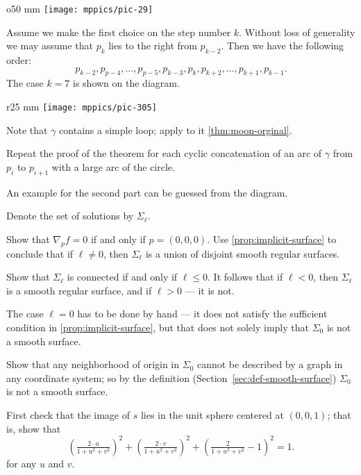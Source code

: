 {

\begin{wrapfigure}{o}{50 mm}
\vskip0mm
\centering
\texttt{[image: mppics/pic-29]}
\vskip0mm
\end{wrapfigure}

Assume we make the first choice on the step number $k$.
Without loss of generality we may assume that $p_k$ lies to the right from $p_{k-2}$.
Then we have the following order:
\[
p_{k-2},p_{p-4},\dots,p_{p-5},p_{k-3},p_k,p_{k+2},\dots,p_{k+1},p_{k-1}.
\]
The case $k=7$ is shown on the diagram.

}

\begin{wrapfigure}[7]{r}{25 mm}
\vskip-3mm
\centering
\texttt{[image: mppics/pic-305]}
\vskip0mm
\end{wrapfigure}

 Note that $\gamma$ contains a simple loop; apply to it \ref{thm:moon-orginal}.

Repeat the proof of the theorem for each cyclic concatenation of an arc of $\gamma$ from $p_i$ to $p_{i+1}$ with a large arc of the circle. 

An example for the second part can be guessed from the diagram.

\setcounter{eqtn}{0}

Denote the set of solutions by $\Sigma_\ell$.

Show that $\nabla_p f=0$ if and only if $p=(0,0,0)$.
Use \ref{prop:implicit-surface} to conclude that if $\ell\ne 0$, then $\Sigma_\ell$ is a union of disjoint smooth regular surfaces.

Show that $\Sigma_\ell$ is connected if and only if $\ell\le 0$.
It follows that if $\ell<0$, then $\Sigma_\ell$ is a smooth regular surface, and if $\ell>0$ --- it is not.

The case $\ell=0$ has to be done by hand --- it does not satisfy the sufficient condition in \ref{prop:implicit-surface}, but that does not solely imply that $\Sigma_0$ is not a smooth surface.

Show that any neighborhood of origin in $\Sigma_0$ cannot be described by a graph in any coordinate system;
so by the definition (Section~\ref{sec:def-smooth-surface}) $\Sigma_0$ is not a smooth surface.

First check that the image of $s$ lies in the unit sphere centered at $(0,0,1)$;
that is, show that 
\[\left(\tfrac{2\cdot u}{1+u^2+v^2}\right)^2
+
\left(\tfrac{2\cdot v}{1+u^2+v^2}\right)^2
+\left(\tfrac{2}{1+u^2+v^2}-1\right)^2=1.\]
for any $u$ and $v$.

